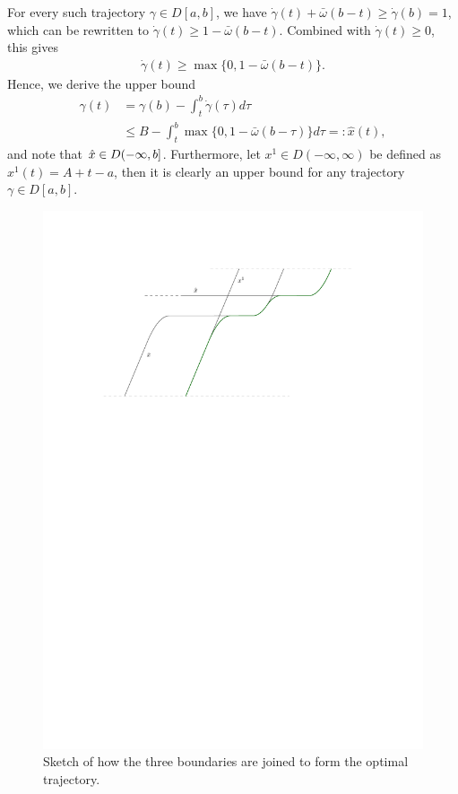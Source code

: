 \documentclass[a4paper]{article}
\theoremstyle{definition}
\theoremstyle{plain}
\begin{document}
For every such trajectory $\gamma \in D[a,b]$, we have
$\dot{\gamma}(t) + \bar{\omega} (b - t) \geq \dot{\gamma}(b) = 1$, which can be
rewritten to $\dot{\gamma}(t) \geq 1 - \bar{\omega} (b - t)$. Combined with
$\dot{\gamma}(t) \geq 0$, this gives
\begin{align}
  \dot{\gamma}(t) \geq \max \{ 0, 1 - \bar{\omega}(b - t) \} .
\end{align}
Hence, we derive the upper bound
\begin{subequations}
\begin{align}
  \gamma(t) &= \gamma(b) - \int_{t}^{b} \dot{\gamma}(\tau) d \tau \\
  &\leq B - \int_{t}^{b} \max\{ 0, 1 -\bar{\omega} (b - \tau) \} d \tau =: \hat{x}(t),
\end{align}
\end{subequations}
and note that $\hat{x} \in D(-\infty,b]$.
%
Furthermore, let $x^{1} \in D(-\infty, \infty)$ be defined as
$x^{1}(t) = A + t - a$, then it is clearly an upper bound for any trajectory
$\gamma \in D[a, b]$.


\begin{figure}
  \centering
  \includegraphics[scale=1]{figures/motion/rough/proof}
  \caption{Sketch of how the three boundaries are joined to form the
    optimal trajectory.}%
  \label{fig:theorem-proof}
\end{figure}
\end{document}
